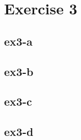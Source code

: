 \section{Exercise 3}
\subsection{ex3-a}

\subsection{ex3-b}

\subsection{ex3-c}

\subsection{ex3-d}
